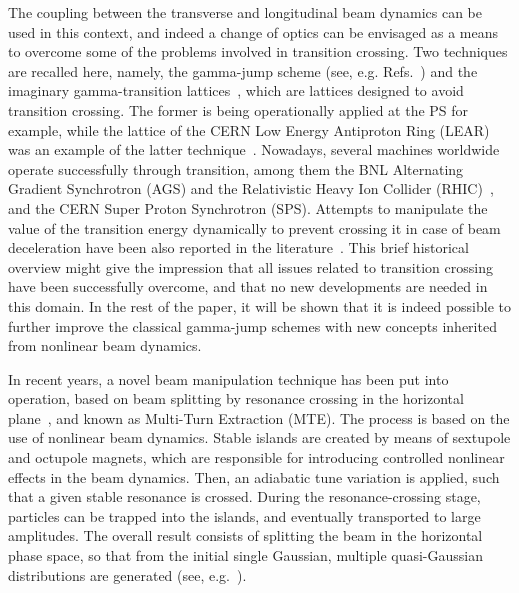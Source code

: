 \documentclass{article}
\begin{document}
The coupling between the transverse and longitudinal beam dynamics can be used in this context, and indeed a change of optics can be envisaged as a means to overcome some of the problems involved in transition crossing. Two techniques are recalled here, namely, the gamma-jump scheme (see, e.g. Refs.~\cite{gj1,gj2,gj3}) and the imaginary gamma-transition lattices~\cite{img1,img2}, which are lattices designed to avoid transition crossing. The former is being operationally applied at the PS for example, while the lattice of the CERN Low Energy Antiproton Ring (LEAR) was an example of the latter technique~\cite{lear}. Nowadays, several machines worldwide operate successfully through transition, among them the BNL Alternating Gradient Synchrotron (AGS) and the Relativistic Heavy Ion Collider (RHIC)~\cite{rhic1,rhic2,rhic3,rhic4}, and the CERN Super Proton Synchrotron (SPS). Attempts to manipulate the value of the transition energy dynamically to prevent crossing it in case of beam deceleration have been also reported in the literature~\cite{stancari}. This brief historical overview might give the impression that all issues related to transition crossing have been successfully overcome, and that no new developments are needed in this domain. In the rest of the paper, it will be shown that it is indeed possible to further improve the classical gamma-jump schemes with new concepts inherited from nonlinear beam dynamics. 

In recent years, a novel beam manipulation technique has been put into operation, based on beam splitting by resonance crossing in the horizontal plane~\cite{prl,epac}, and known as Multi-Turn Extraction (MTE). The process is based on the use of nonlinear beam dynamics. Stable islands are created by means of sextupole and octupole magnets, which are responsible for introducing controlled nonlinear effects in the beam dynamics. Then, an adiabatic tune variation is applied, such that a given stable resonance is crossed. During the resonance-crossing stage, particles can be trapped into the islands, and eventually transported to large amplitudes. The overall result consists of splitting the beam in the horizontal phase space, so that from the initial single Gaussian, multiple quasi-Gaussian distributions are generated (see, e.g.~\cite{prl,epac}). 
\end{document}
